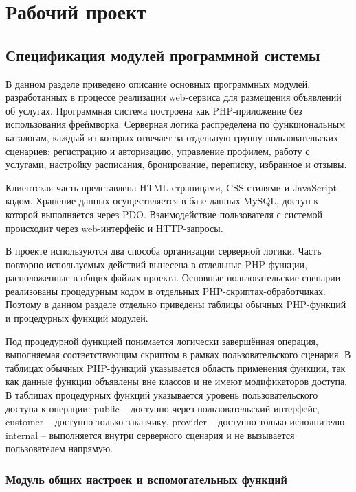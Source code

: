 \section{Рабочий проект}

\subsection{Спецификация модулей программной системы}

В данном разделе приведено описание основных программных модулей, разработанных в процессе реализации web-сервиса для размещения объявлений об услугах. Программная система построена как PHP-приложение без использования фреймворка. Серверная логика распределена по функциональным каталогам, каждый из которых отвечает за отдельную группу пользовательских сценариев: регистрацию и авторизацию, управление профилем, работу с услугами, настройку расписания, бронирование, переписку, избранное и отзывы.

Клиентская часть представлена HTML-страницами, CSS-стилями и JavaScript-кодом. Хранение данных осуществляется в базе данных MySQL, доступ к которой выполняется через PDO. Взаимодействие пользователя с системой происходит через web-интерфейс и HTTP-запросы.

В проекте используются два способа организации серверной логики. Часть повторно используемых действий вынесена в отдельные PHP-функции, расположенные в общих файлах проекта. Основные пользовательские сценарии реализованы процедурным кодом в отдельных PHP-скриптах-обработчиках. Поэтому в данном разделе отдельно приведены таблицы обычных PHP-функций и процедурных функций модулей.

Под процедурной функцией понимается логически завершённая операция, выполняемая соответствующим скриптом в рамках пользовательского сценария. В таблицах обычных PHP-функций указывается область применения функции, так как данные функции объявлены вне классов и не имеют модификаторов доступа. В таблицах процедурных функций указывается уровень пользовательского доступа к операции: public -- доступно через пользовательский интерфейс, customer -- доступно только заказчику, provider -- доступно только исполнителю, internal -- выполняется внутри серверного сценария и не вызывается пользователем напрямую.

\subsubsection{Модуль общих настроек и вспомогательных функций}

